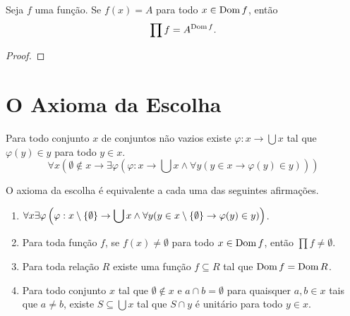 \begin{proposition}
    Seja $f$ uma função. Se $f(x) = A$ para todo $x \in \operatorname{Dom} f$, então
        \[
            \prod f = A^{\operatorname{Dom} f}.
        \]
\end{proposition}

\begin{proof}
    \blackproof
\end{proof}

\section{O Axioma da Escolha}

\begin{axiom}[da Escolha]
    Para todo conjunto $x$ de conjuntos não vazios existe $\varphi : x \to \bigcup x$ tal que $\varphi(y) \in y$ para todo $y \in x$.
        \[
            \boxed{
                \forall x \left(\emptyset \notin x \rightarrow \exists \varphi \left( \varphi : x \to \bigcup x \land \forall y (y \in x \rightarrow \varphi(y) \in y) \right)\right)
            }        
        \]
\end{axiom}

\begin{theorem}
    O axioma da escolha é equivalente a cada uma das seguintes afirmações.
        \begin{enumerate}[leftmargin=*, align=left, label=\textbf{(\alph*)}]
            \item $\displaystyle \forall x \exists \varphi \left( \varphi : x \setminus \{\emptyset\} \to \bigcup x \land \forall y (y \in x \setminus \{\emptyset\} \rightarrow \varphi(y) \in y) \right)$.
            \item Para toda função $f$, se $f(x) \neq \emptyset$ para todo $x \in \operatorname{Dom} f$, então $\prod f \neq \emptyset$.
            \item Para toda relação $R$ existe uma função $f \subseteq R$ tal que $\operatorname{Dom} f = \operatorname{Dom} R$.
            \item Para todo conjunto $x$ tal que $\emptyset \notin x$ e $a \cap b = \emptyset$ para quaisquer $a,b \in x$ tais que $a \neq b$, existe $S \subseteq \bigcup x$ tal que $S \cap y$ é unitário para todo $y \in x$.
        \end{enumerate}
\end{theorem}

